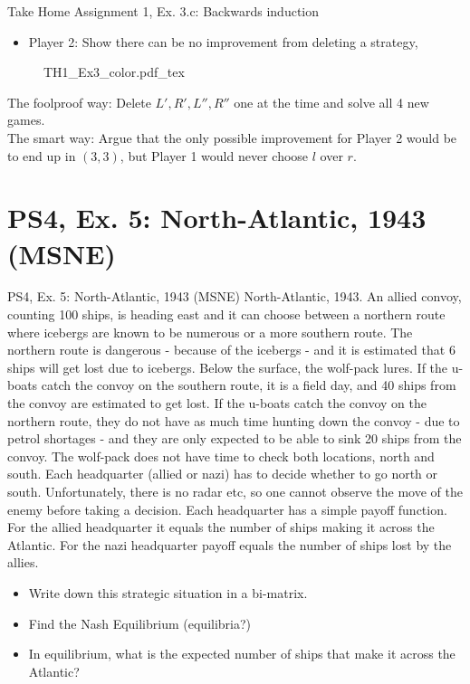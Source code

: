 \begin{frame}{Take Home Assignment 1, Ex. 3.c: Backwards induction}
  \begin{itemize}
    \item[(3c)] Player 2: Show there can be no improvement from deleting a strategy,
  \end{itemize}
  \begin{figure}[!h]
    \center
    \def\svgwidth{\columnwidth}
    {TH1_Ex3_color.pdf_tex}
  \end{figure}
  The foolproof way: Delete $L',R',L'',R''$ one at the time and solve all 4 new games.\\\medskip
  The smart way: Argue that the only possible improvement for Player 2 would be to end up in $(3,3)$, but Player 1 would never choose $l$ over $r$.
\end{frame}


\section{PS4, Ex. 5: North-Atlantic, 1943 (MSNE)}

\begin{frame}{PS4, Ex. 5: North-Atlantic, 1943 (MSNE)}
  North-Atlantic, 1943. An allied convoy, counting 100 ships, is heading east and it can choose between a northern route where icebergs are known to be numerous or a more southern route. The northern route is dangerous - because of the icebergs - and it is estimated that 6 ships will get lost due to icebergs. Below the surface, the wolf-pack lures. If the u-boats catch the convoy on the southern route, it is a field day, and 40 ships from the convoy are estimated to get lost. If the u-boats catch the convoy on the northern route, they do not have as much time hunting down the convoy - due to petrol shortages - and they are only expected to be able to sink 20 ships from the convoy. The wolf-pack does not have time to check both locations, north and south. Each headquarter (allied or nazi) has to decide whether to go north or south. Unfortunately, there is no radar etc, so one cannot observe the move of the enemy before taking a decision. Each headquarter has a simple payoff function. For the allied headquarter it equals the number of ships making it across the Atlantic. For the nazi headquarter payoff equals the number of ships lost by the allies.
  \begin{itemize}
    \item[(a)] Write down this strategic situation in a bi-matrix.
    \item[(b)] Find the Nash Equilibrium (equilibria?)
    \item[(c)] In equilibrium, what is the expected number of ships that make it across the Atlantic?
  \end{itemize}
  \vfill\null
\end{frame}

